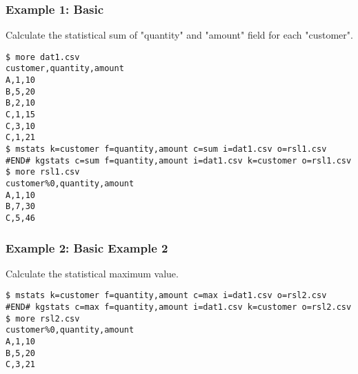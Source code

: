 \subsubsection*{Example 1: Basic }

Calculate the statistical sum of "quantity" and "amount" field for each "customer".


\begin{Verbatim}[baselinestretch=0.7,frame=single]
$ more dat1.csv
customer,quantity,amount
A,1,10
B,5,20
B,2,10
C,1,15
C,3,10
C,1,21
$ mstats k=customer f=quantity,amount c=sum i=dat1.csv o=rsl1.csv
#END# kgstats c=sum f=quantity,amount i=dat1.csv k=customer o=rsl1.csv
$ more rsl1.csv
customer%0,quantity,amount
A,1,10
B,7,30
C,5,46
\end{Verbatim}
\subsubsection*{Example 2: Basic Example 2}

Calculate the statistical maximum value.


\begin{Verbatim}[baselinestretch=0.7,frame=single]
$ mstats k=customer f=quantity,amount c=max i=dat1.csv o=rsl2.csv
#END# kgstats c=max f=quantity,amount i=dat1.csv k=customer o=rsl2.csv
$ more rsl2.csv
customer%0,quantity,amount
A,1,10
B,5,20
C,3,21
\end{Verbatim}
